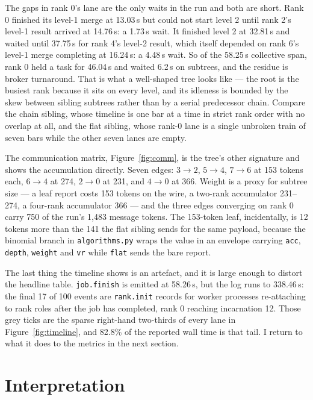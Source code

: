 \documentclass[11pt]{article}
\begin{document}
The gaps in rank 0's lane are the only waits in the run and both are short. Rank 0
finished its level-1 merge at 13.03\,s but could not start level 2 until rank 2's
level-1 result arrived at 14.76\,s: a 1.73\,s wait. It finished level 2 at 32.81\,s and
waited until 37.75\,s for rank 4's level-2 result, which itself depended on rank 6's
level-1 merge completing at 16.24\,s: a 4.48\,s wait. So of the 58.25\,s collective
span, rank 0 held a task for 46.04\,s and waited 6.2\,s on subtrees, and the residue is
broker turnaround. That is what a well-shaped tree looks like --- the root is the
busiest rank because it sits on every level, and its idleness is bounded by the skew
between sibling subtrees rather than by a serial predecessor chain. Compare the chain
sibling, whose timeline is one bar at a time in strict rank order with no overlap at
all, and the flat sibling, whose rank-0 lane is a single unbroken train of seven bars
while the other seven lanes are empty.

The communication matrix, Figure~\ref{fig:comm}, is the tree's other signature and
shows the accumulation directly. Seven edges: $3 \to 2$, $5 \to 4$, $7 \to 6$ at 153
tokens each, $6 \to 4$ at 274, $2 \to 0$ at 231, and $4 \to 0$ at 366. Weight is a
proxy for subtree size --- a leaf report costs 153 tokens on the wire, a two-rank
accumulator 231--274, a four-rank accumulator 366 --- and the three edges converging on
rank 0 carry 750 of the run's 1{,}483 message tokens. The 153-token leaf, incidentally,
is 12 tokens more than the 141 the flat sibling sends for the same payload, because the
binomial branch in \texttt{algorithms.py} wraps the value in an envelope carrying
\texttt{acc}, \texttt{depth}, \texttt{weight} and \texttt{vr} while \texttt{flat} sends
the bare report.

The last thing the timeline shows is an artefact, and it is large enough to distort the
headline table. \texttt{job.finish} is emitted at 58.26\,s, but the log runs to
338.46\,s: the final 17 of 100 events are \texttt{rank.init} records for worker
processes re-attaching to rank roles after the job has completed, rank 0 reaching
incarnation 12. Those grey ticks are the sparse right-hand two-thirds of every lane in
Figure~\ref{fig:timeline}, and 82.8\% of the reported wall time is that tail. I return
to what it does to the metrics in the next section.

\section{Interpretation}
\end{document}
